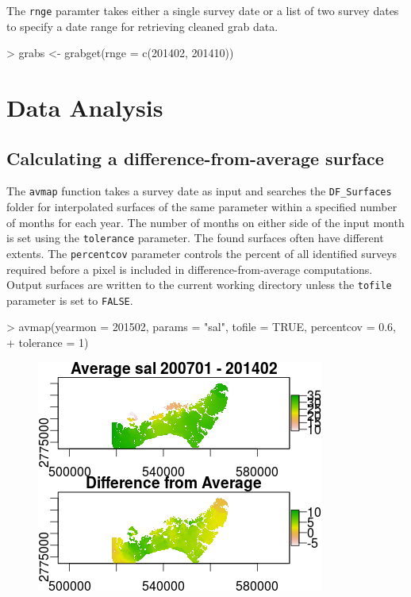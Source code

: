 \documentclass[12pt]{article}
\begin{document}
The \texttt{rnge} paramter takes either a single survey date or a list of two survey dates to specify a date range for retrieving cleaned grab data.

\begin{Schunk}
\begin{Sinput}
> grabs <- grabget(rnge = c(201402, 201410))
\end{Sinput}
\end{Schunk}

\section{Data Analysis}
\subsection{Calculating a difference-from-average surface}
The \texttt{avmap} function takes a survey date as input and searches the \verb|DF_Surfaces| folder for interpolated surfaces of the same parameter within a specified number of months for each year. The number of months on either side of the input month is set using the \texttt{tolerance} parameter. The found surfaces often have different extents. The \texttt{percentcov} parameter controls the percent of all identified surveys required before a pixel is included in difference-from-average computations. Output surfaces are written to the current working directory unless the \texttt{tofile} parameter is set to \texttt{FALSE}.

\begin{Schunk}
\begin{Sinput}
> avmap(yearmon = 201502, params = "sal", tofile = TRUE, percentcov = 0.6,
+       tolerance = 1)
\end{Sinput}
\end{Schunk}

\begin{figure}[H]
\begin{center}
\includegraphics{figure2}
\end{center}
\label{fig:two}
\end{figure}
\end{document}
